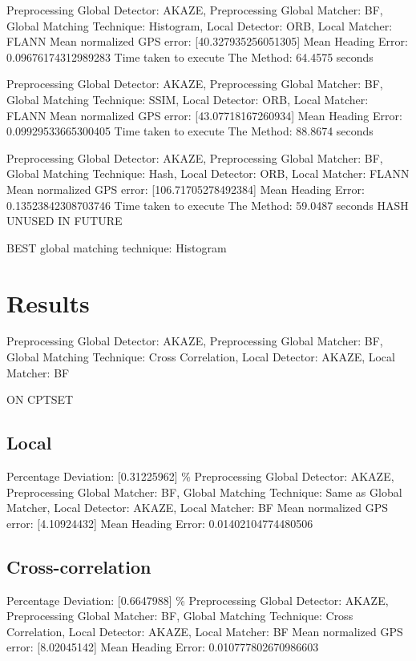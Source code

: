 Preprocessing Global Detector: AKAZE, Preprocessing Global Matcher: BF, Global Matching Technique: Histogram, Local Detector: ORB, Local Matcher: FLANN
Mean normalized GPS error: [40.327935256051305]
Mean Heading Error: 0.09676174312989283
Time taken to execute The Method: 64.4575 seconds


Preprocessing Global Detector: AKAZE, Preprocessing Global Matcher: BF, Global Matching Technique: SSIM, Local Detector: ORB, Local Matcher: FLANN
Mean normalized GPS error: [43.07718167260934]
Mean Heading Error: 0.09929533665300405
Time taken to execute The Method: 88.8674 seconds


Preprocessing Global Detector: AKAZE, Preprocessing Global Matcher: BF, Global Matching Technique: Hash, Local Detector: ORB, Local Matcher: FLANN
Mean normalized GPS error: [106.71705278492384]
Mean Heading Error: 0.13523842308703746
Time taken to execute The Method: 59.0487 seconds
HASH UNUSED IN FUTURE

BEST global matching technique: Histogram





\section*{Results}
Preprocessing Global Detector: AKAZE, Preprocessing Global Matcher: BF, Global Matching Technique: Cross Correlation, Local Detector: AKAZE, Local Matcher: BF

ON CPTSET

\subsection*{Local}

Percentage Deviation: [0.31225962] \%
Preprocessing Global Detector: AKAZE, Preprocessing Global Matcher: BF, Global Matching Technique: Same as Global Matcher, Local Detector: AKAZE, Local Matcher: BF
Mean normalized GPS error: [4.10924432]
 Mean Heading Error: 0.01402104774480506

\subsection*{Cross-correlation}
Percentage Deviation: [0.6647988] \%
Preprocessing Global Detector: AKAZE, Preprocessing Global Matcher: BF, Global Matching Technique: Cross Correlation, Local Detector: AKAZE, Local Matcher: BF
Mean normalized GPS error: [8.02045142]
 Mean Heading Error: 0.010777802670986603



